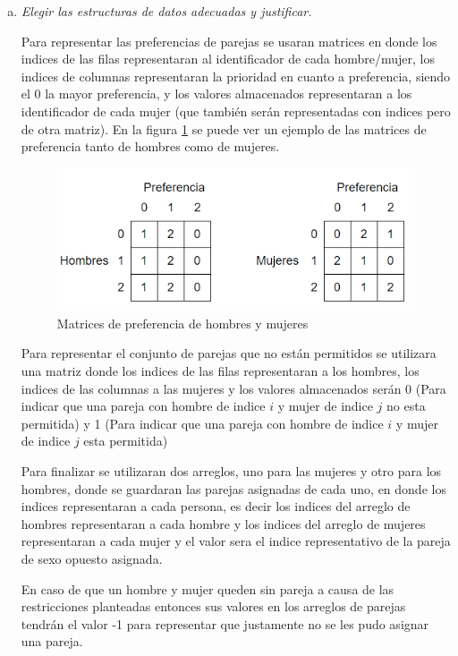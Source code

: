 \begin{enumerate}[a)]
  \item \textit{Elegir las estructuras de datos adecuadas y justificar.}
  
  Para representar las preferencias de parejas se usaran matrices en donde los indices de las filas representaran al identificador de cada hombre/mujer, los indices de columnas representaran la prioridad en cuanto a preferencia, siendo el 0 la mayor preferencia, y los valores almacenados representaran a los identificador de cada mujer (que también serán representadas con indices pero de otra matriz). En la figura \ref{fig:MatricesPreferencia} se puede ver un ejemplo de las matrices de preferencia tanto de hombres como de mujeres.

  \begin{figure}[!htb]
    \centering
    \includegraphics[width=\textwidth, scale=1]{Images/Punto1/MatricesPreferencia.png}
    \caption{Matrices de preferencia de hombres y mujeres}
    \label{fig:MatricesPreferencia}
  \end{figure}

  Para representar el conjunto de parejas que no están permitidos se utilizara una matriz donde los indices de las filas representaran a los hombres, los indices de las columnas a las mujeres y los valores almacenados serán 0 (Para indicar que una pareja con hombre de indice $i$ y mujer de indice $j$ no esta permitida) y 1 (Para indicar que una pareja con hombre de indice $i$ y mujer de indice $j$ esta permitida)

  Para finalizar se utilizaran dos arreglos, uno para las mujeres y otro para los hombres, donde se guardaran las parejas asignadas de cada uno, en donde los indices representaran a cada persona, es decir los indices del arreglo de hombres representaran a cada hombre y los indices del arreglo de mujeres representaran a cada mujer y el valor sera el indice representativo de la pareja de sexo opuesto asignada.
  
  En caso de que un hombre y mujer queden sin pareja a causa de las restricciones planteadas entonces sus valores en los arreglos de parejas tendrán el valor -1 para representar que justamente no se les pudo asignar una pareja.


\end{enumerate}
